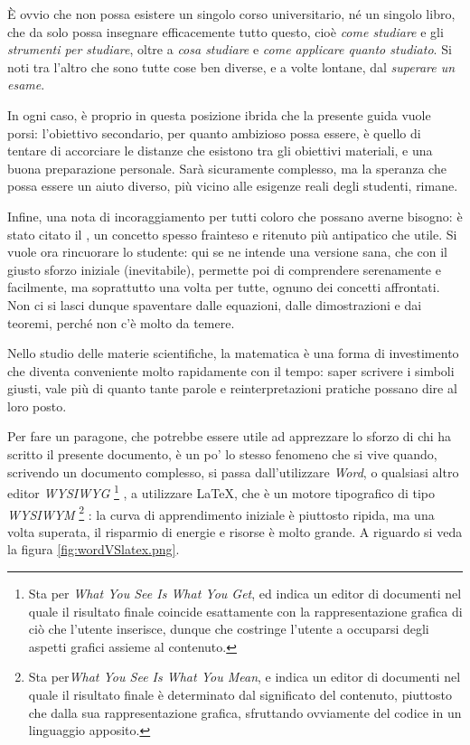 È ovvio che non possa esistere un singolo corso universitario, né un singolo
libro, che da solo possa insegnare efficacemente tutto questo, cioè
\emph{come studiare} e gli \emph{strumenti per studiare}, oltre a \emph{cosa
studiare} e \emph{come applicare quanto studiato}. Si noti tra l'altro che sono
tutte cose ben diverse, e a volte lontane, dal \emph{superare un esame}.

In ogni caso, è proprio in questa posizione ibrida che la presente guida vuole
porsi: l'obiettivo secondario, per quanto ambizioso possa essere, è quello di
tentare di accorciare le distanze che esistono tra gli obiettivi materiali, e
una buona preparazione personale. Sarà sicuramente complesso, ma la speranza che
possa essere un aiuto diverso, più vicino alle esigenze reali degli studenti,
rimane.

Infine, una nota di incoraggiamento per tutti coloro che possano averne bisogno:
è stato citato il , un concetto spesso frainteso e
ritenuto più antipatico che utile. Si vuole ora rincuorare lo studente: qui se
ne intende una versione sana, che con il giusto sforzo iniziale (inevitabile),
permette poi di comprendere serenamente e facilmente, ma soprattutto una volta
per tutte, ognuno dei concetti affrontati. Non ci si lasci dunque spaventare
dalle equazioni, dalle dimostrazioni e dai teoremi, perché non c'è molto da
temere.

Nello studio delle materie scientifiche, la matematica è una forma di
investimento che diventa conveniente molto rapidamente con il tempo: saper
scrivere i simboli giusti, vale più di quanto tante parole e reinterpretazioni
pratiche possano dire al loro posto.

Per fare un paragone, che potrebbe essere utile ad apprezzare lo sforzo di chi
ha scritto il presente documento, è un po' lo stesso fenomeno che si vive
quando, scrivendo un documento complesso, si passa dall'utilizzare \emph{Word},
o qualsiasi altro editor \emph{WYSIWYG}%
\footnote{Sta per \emph{What You See Is What You Get}, ed indica un editor di
documenti nel quale il risultato finale coincide esattamente con la
rappresentazione grafica di ciò che l'utente inserisce, dunque che costringe
l'utente a occuparsi degli aspetti grafici assieme al contenuto.}%
, a utilizzare
\LaTeX, che è un motore tipografico di tipo \emph{WYSIWYM}%
\footnote{Sta per\emph{What You See Is What You Mean}, e indica un editor di
documenti nel quale il risultato finale è determinato dal significato del
contenuto, piuttosto che dalla sua rappresentazione grafica, sfruttando
ovviamente del codice in un linguaggio apposito.}%
: la curva di apprendimento iniziale è piuttosto ripida,
ma una volta superata, il risparmio di energie e risorse è molto grande.
A riguardo si veda la figura \ref{fig:wordVSlatex.png}.
%


